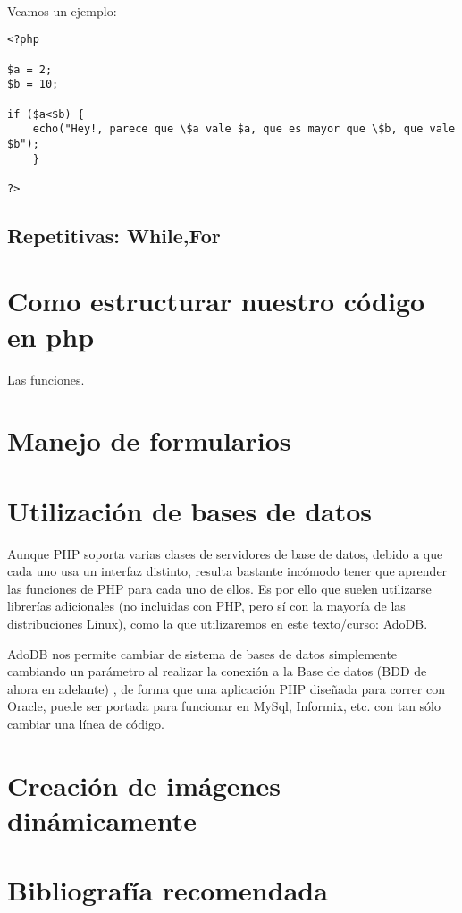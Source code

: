 \begin{verbatim}
	
\end{verbatim}



Veamos un ejemplo:

\begin{verbatim}
<?php

$a = 2;
$b = 10;

if ($a<$b) {
	echo("Hey!, parece que \$a vale $a, que es mayor que \$b, que vale $b");
	}
	
?>
\end{verbatim}



\subsection{Repetitivas: While,For}

\section{Como estructurar nuestro código en php}

Las funciones. 

\section{Manejo de formularios}


\section{Utilización  de bases  de  datos} Aunque  PHP soporta  varias
clases de servidores  de base de datos,  debido a que cada  uno usa un
interfaz distinto,  resulta bastante  incómodo tener que  aprender las
funciones  de PHP  para cada  uno  de ellos.  Es por  ello que  suelen
utilizarse librerías adicionales (no incluidas con PHP, pero sí con la
mayoría de las distribuciones Linux), como la que utilizaremos en este
texto/curso: AdoDB.

AdoDB nos  permite cambiar  de sistema de  bases de  datos simplemente
cambiando un parámetro al realizar la conexión a la Base de datos (BDD
de ahora en adelante) , de  forma que una aplicación PHP diseñada para
correr  con  Oracle,  puede  ser  portada  para  funcionar  en  MySql,
Informix, etc. con tan sólo cambiar una línea de código.


\section{Creación de imágenes dinámicamente}

\section {Bibliografía recomendada}


